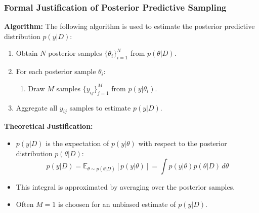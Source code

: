 \documentclass{beamer}
\begin{document}
\begin{frame}
    \frametitle{Formal Justification of Posterior Predictive Sampling}
    \textbf{Algorithm:}
    The following algorithm is used to estimate the posterior predictive distribution \( p(y|D) \):
    \begin{enumerate}
        \item Obtain \( N \) posterior samples \( \{\theta_i\}_{i=1}^N \) from \( p(\theta|D) \).
        \item For each posterior sample \( \theta_i \):
        \begin{enumerate}
            \item Draw \( M \) samples \( \{y_{ij}\}_{j=1}^M \) from \( p(y|\theta_i) \).
        \end{enumerate}
        \item Aggregate all \( y_{ij} \) samples to estimate \( p(y|D) \).
    \end{enumerate}
    
    \textbf{Theoretical Justification:}
    \begin{itemize}
        \item \( p(y|D) \) is the expectation of \( p(y|\theta) \) with respect to the posterior distribution \( p(\theta|D) \):
        \[
        p(y|D) = \mathbb{E}_{\theta \sim p(\theta|D)}[p(y|\theta)] = \int p(y|\theta) p(\theta|D) \, d\theta
        \]
        \item This integral is approximated by averaging over the posterior samples.
        \item Often $M=1$ is choosen for an unbiased estimate of $p(y|D)$.
    \end{itemize}
\end{frame}
\end{document}
